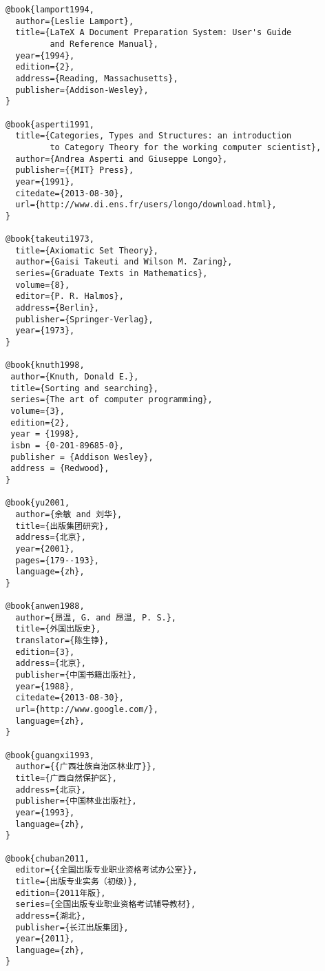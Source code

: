 \begin{verbatim}
@book{lamport1994,
  author={Leslie Lamport},
  title={LaTeX A Document Preparation System: User's Guide 
         and Reference Manual},
  year={1994},
  edition={2},
  address={Reading, Massachusetts},
  publisher={Addison-Wesley},
}

@book{asperti1991,
  title={Categories, Types and Structures: an introduction 
         to Category Theory for the working computer scientist},
  author={Andrea Asperti and Giuseppe Longo},
  publisher={{MIT} Press},
  year={1991},
  citedate={2013-08-30},
  url={http://www.di.ens.fr/users/longo/download.html},
}

@book{takeuti1973,
  title={Axiomatic Set Theory},
  author={Gaisi Takeuti and Wilson M. Zaring},
  series={Graduate Texts in Mathematics},
  volume={8},
  editor={P. R. Halmos},
  address={Berlin},
  publisher={Springer-Verlag},
  year={1973},
}

@book{knuth1998,
 author={Knuth, Donald E.},
 title={Sorting and searching},
 series={The art of computer programming},
 volume={3},
 edition={2},
 year = {1998},
 isbn = {0-201-89685-0},
 publisher = {Addison Wesley},
 address = {Redwood},
} 

@book{yu2001,
  author={余敏 and 刘华},
  title={出版集团研究},
  address={北京},
  year={2001},
  pages={179--193},
  language={zh},
}

@book{anwen1988,
  author={昂温, G. and 昂温, P. S.},
  title={外国出版史},
  translator={陈生铮},
  edition={3},
  address={北京},
  publisher={中国书籍出版社},
  year={1988},
  citedate={2013-08-30},
  url={http://www.google.com/},
  language={zh},  
}

@book{guangxi1993,
  author={{广西壮族自治区林业厅}},
  title={广西自然保护区},
  address={北京},
  publisher={中国林业出版社},
  year={1993},
  language={zh},
}

@book{chuban2011,
  editor={{全国出版专业职业资格考试办公室}},
  title={出版专业实务（初级）},
  edition={2011年版},
  series={全国出版专业职业资格考试辅导教材},
  address={湖北},
  publisher={长江出版集团},
  year={2011},
  language={zh},
}
\end{verbatim}

